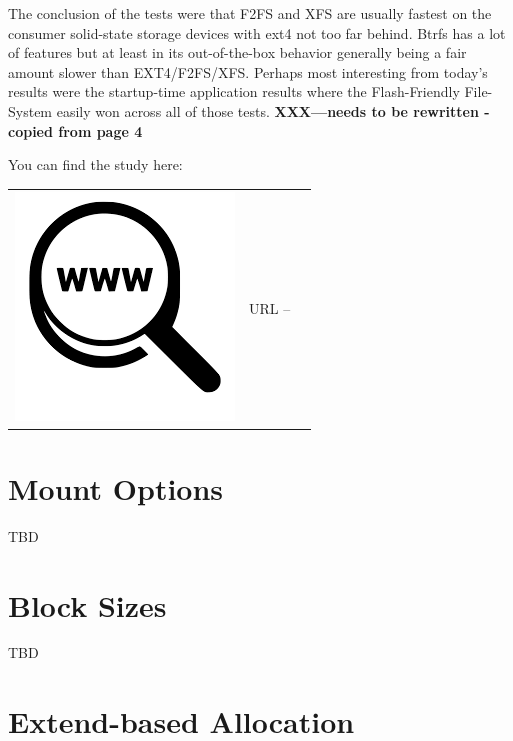 The conclusion of the tests were that F2FS and XFS are usually fastest on the consumer solid-state storage devices with ext4 not too far behind. Btrfs has a lot of features but at least in its out-of-the-box behavior generally being a fair amount slower than EXT4/F2FS/XFS. Perhaps most interesting from today's results were the startup-time application results where the Flash-Friendly File-System easily won across all of those tests. \textbf{XXX---needs to be rewritten - copied from page 4}

You can find the study here:

\begin{table}[h]
\begin{tabular}{lcl}
\parbox[r]{0.5in}{\includegraphics[scale=0.15]{figures/url.png}} & \parbox[l]{0.5in}{URL  -- } & \parbox[l]{3in}{}
\end{tabular}
\end{table}


\section{Mount Options}

TBD


\section{Block Sizes}

TBD

%

\section{Extend-based Allocation}

